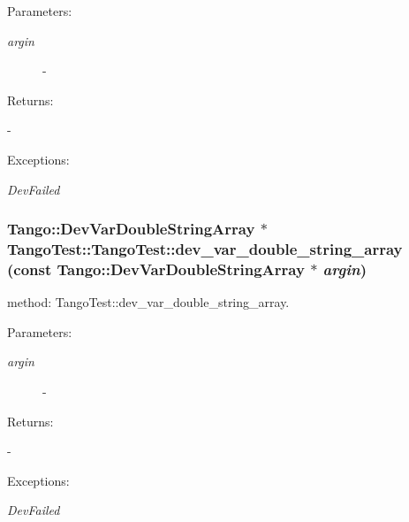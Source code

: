 \begin{Desc}
\item[Parameters: ]\par
\begin{description}
\item[{\em 
argin}]- \end{description}
\end{Desc}
\begin{Desc}
\item[Returns: ]\par
- \end{Desc}
\begin{Desc}
\item[Exceptions: ]\par
\begin{description}
\item[{\em 
Dev\-Failed}] \end{description}
\end{Desc}
\subsubsection{\setlength{\rightskip}{0pt plus 5cm}Tango::Dev\-Var\-Double\-String\-Array $\ast$ Tango\-Test::Tango\-Test::dev\_\-var\_\-double\_\-string\_\-array (const Tango::Dev\-Var\-Double\-String\-Array $\ast$ {\em argin})}\label{classTangoTest_1_1TangoTest_z5_21}


method: Tango\-Test::dev\_\-var\_\-double\_\-string\_\-array.

\begin{Desc}
\item[Parameters: ]\par
\begin{description}
\item[{\em 
argin}]- \end{description}
\end{Desc}
\begin{Desc}
\item[Returns: ]\par
- \end{Desc}
\begin{Desc}
\item[Exceptions: ]\par
\begin{description}
\item[{\em 
Dev\-Failed}] \end{description}
\end{Desc}
